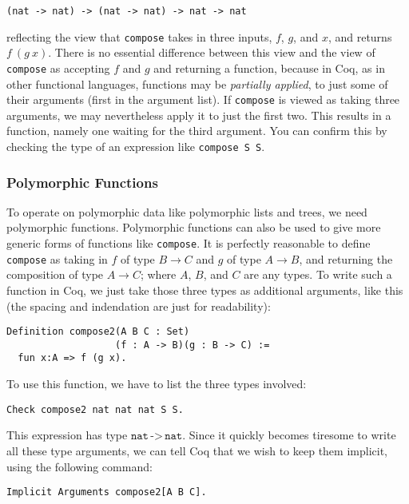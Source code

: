 \documentclass{book}[12pt]
\begin{document}
\begin{verbatim}
(nat -> nat) -> (nat -> nat) -> nat -> nat
\end{verbatim}

\noindent reflecting the view that \texttt{compose} takes in three
inputs, $f$, $g$, and $x$, and returns $f\ (g\ x)$.  There is no
essential difference between this view and the view of
\texttt{compose} as accepting $f$ and $g$ and returning a function,
because in Coq, as in other functional languages, functions may be
\emph{partially applied}, to just some of their arguments (first in
the argument list).  If \texttt{compose} is viewed as taking three
arguments, we may nevertheless apply it to just the first two.  This
results in a function, namely one waiting for the third argument.
You can confirm this by checking the type of an expression like
\texttt{compose S S}.

\subsubsection{Polymorphic Functions}

To operate on polymorphic data like polymorphic lists and trees, we
need polymorphic functions.  Polymorphic functions can also be used to
give more generic forms of functions like \texttt{compose}.  It is
perfectly reasonable to define \texttt{compose} as taking in $f$ of
type $B \to C$ and $g$ of type $A \to B$, and returning the
composition of type $A \to C$; where $A$, $B$, and $C$ are any types.
To write such a function in Coq, we just take those three types as
additional arguments, like this (the spacing and indendation are just
for readability):

\begin{verbatim}
Definition compose2(A B C : Set)
                   (f : A -> B)(g : B -> C) := 
  fun x:A => f (g x).
\end{verbatim}

\noindent To use this function, we have to list the three types involved:

\begin{verbatim}
Check compose2 nat nat nat S S.
\end{verbatim}

\noindent This expression has type
$\texttt{nat}\,\texttt{->}\,\texttt{nat}$.  Since it quickly becomes
tiresome to write all these type arguments, we can tell Coq that we
wish to keep them implicit, using the following command:

\begin{verbatim}
Implicit Arguments compose2[A B C].
\end{verbatim}
\end{document}
